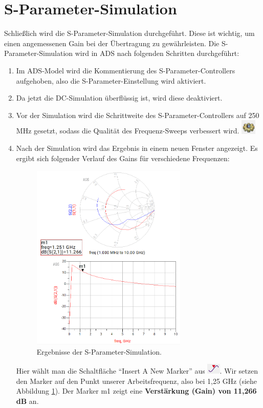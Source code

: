 \section{S-Parameter-Simulation}
\label{sec:s_parameter_simulation}
Schließlich wird die S-Parameter-Simulation durchgeführt. Diese ist wichtig, um einen angemessenen Gain bei der Übertragung zu gewährleisten.
Die S-Parameter-Simulation wird in \ac{ADS} nach folgenden Schritten durchgeführt:
\begin{enumerate}
    \item Im ADS-Model wird die Kommentierung des S-Parameter-Controllers aufgehoben, also die S-Parameter-Einstellung wird aktiviert.
    \item Da jetzt die DC-Simulation überflüssig ist, wird diese deaktiviert.
    \item Vor der Simulation wird die Schrittweite des S-Parameter-Controllers auf 250 MHz gesetzt, sodass die Qualität des Frequenz-Sweeps verbessert wird.
    \includegraphics[height=0.7cm]{Pictures/simulate.png}
    \item Nach der Simulation wird das Ergebnis in einem neuen Fenster angezeigt. Es ergibt sich folgender Verlauf des Gains für verschiedene Frequenzen:
    
    \begin{figure}[h]
            \centering
            \includegraphics[width=0.7\textwidth]{Pictures/SParameter.png}
            \caption{Ergebnisse der S-Parameter-Simulation.}
            \label{fig:SParameter}
        \end{figure}
    
    Hier wählt man die Schaltfläche \enquote{Insert A New Marker} aus \includegraphics[height=0.5cm]{Pictures/marker.png}.
    Wir setzen den Marker auf den Punkt unserer Arbeitsfrequenz, also bei 1{,}25 GHz (siehe Abbildung \ref{fig:SParameter}). Der Marker m1 zeigt eine \textbf{Verstärkung (Gain) von 11,266 dB} an.
\end{enumerate}


